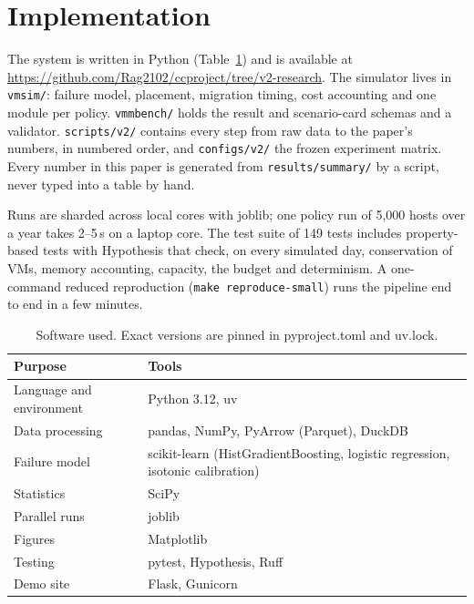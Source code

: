 \documentclass[pdflatex,sn-mathphys-num,iicol]{sn-jnl}
\newcommand{\repourl}{\url{https://github.com/Rag2102/ccproject/tree/v2-research}}
\theoremstyle{thmstyleone}%
\theoremstyle{thmstylethree}%
\begin{document}
\section{Implementation}\label{sec:impl}

The system is written in Python (Table~\ref{tab:stack}) and is available at \repourl. The
simulator lives in \texttt{vmsim/}: failure model, placement, migration timing, cost accounting
and one module per policy. \texttt{vmmbench/} holds the result and scenario-card schemas and a
validator. \texttt{scripts/v2/} contains every step from raw data to the paper's numbers, in
numbered order, and \texttt{configs/v2/} the frozen experiment matrix. Every number in this paper
is generated from \texttt{results/summary/} by a script, never typed into a table by hand.

Runs are sharded across local cores with joblib; one policy run of 5{,}000 hosts over a year takes
2--5\,s on a laptop core. The test suite of 149 tests includes property-based tests with
Hypothesis that check, on every simulated day, conservation of VMs, memory accounting, capacity,
the budget and determinism. A one-command reduced reproduction (\texttt{make reproduce-small})
runs the pipeline end to end in a few minutes.

\begin{table}[!t]\centering
\caption{Software used. Exact versions are pinned in pyproject.toml and uv.lock.}
\label{tab:stack}
\setlength{\tabcolsep}{4pt}\footnotesize
\begin{tabular}{ll}\toprule
Purpose & Tools \\ \midrule
Language and environment & Python 3.12, uv \\
Data processing & pandas, NumPy, PyArrow (Parquet), DuckDB \\
Failure model & scikit-learn (HistGradientBoosting, logistic regression, isotonic calibration) \\
Statistics & SciPy \\
Parallel runs & joblib \\
Figures & Matplotlib \\
Testing & pytest, Hypothesis, Ruff \\
Demo site & Flask, Gunicorn \\
\bottomrule\end{tabular}
\end{table}

\end{document}
